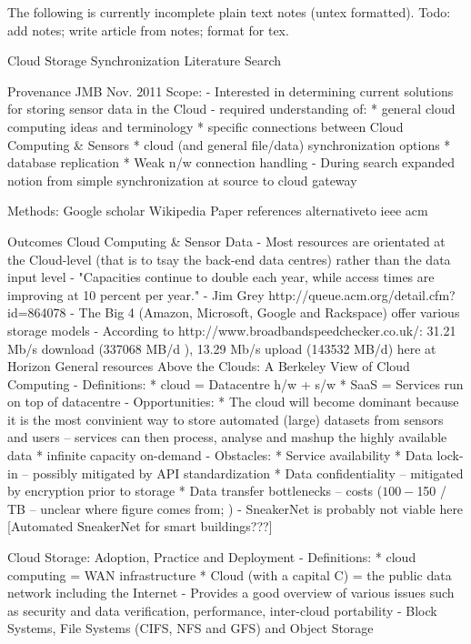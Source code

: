 The following is currently incomplete plain text notes (untex formatted). Todo: add notes; write article from notes; format for tex.

Cloud Storage Synchronization Literature Search

Provenance
	JMB
	Nov. 2011
	Scope: 
		- Interested in determining current solutions for storing sensor data in the Cloud
		- required understanding of:
			* general cloud computing ideas and terminology
			* specific connections between Cloud Computing & Sensors
			* cloud (and general file/data) synchronization options
			* database replication
			* Weak n/w connection handling
		- During search expanded notion from simple synchronization at source to cloud gateway

	Methods:
			Google scholar
			Wikipedia
			Paper references
			alternativeto
			ieee
			acm

Outcomes			
	Cloud Computing & Sensor Data
		- Most resources are orientated at the Cloud-level (that is to tsay the back-end data centres) rather than the data input level
		- "Capacities continue to double each year, while access times are improving at 10 percent per year." - Jim Grey http://queue.acm.org/detail.cfm?id=864078
		- The Big 4 (Amazon, Microsoft, Google and Rackspace) offer various storage models
		- According to http://www.broadbandspeedchecker.co.uk/: 31.21 Mb/s download (337068 MB/d ), 13.29 Mb/s upload (143532 MB/d) here at Horizon
		General resources
			Above the Clouds: A Berkeley View of Cloud Computing
				- Definitions: 	* cloud = Datacentre h/w + s/w
								* SaaS = Services run on top of datacentre
				- Opportunities:	* The cloud will become dominant because it is the most convinient way to store automated (large) datasets from sensors and users -- services can then process, analyse and mashup the highly available data 
									* infinite capacity on-demand
				- Obstacles:	* Service availability
								* Data lock-in -- possibly mitigated by API standardization
								* Data confidentiality -- mitigated by encryption prior to storage
								* Data transfer bottlenecks -- costs ($100-$150 / TB -- unclear where figure comes from; )
																- SneakerNet is probably not viable here [Automated SneakerNet for smart buildings???]
			
			Cloud Storage: Adoption, Practice and Deployment
				- Definitions: 	* cloud computing = WAN infrastructure
								* Cloud (with a capital C) = the public data network including the Internet
				- Provides a good overview of various issues such as security and data verification, performance, inter-cloud portability
				- Block Systems, File Systems (CIFS, NFS and GFS) and Object Storage				

